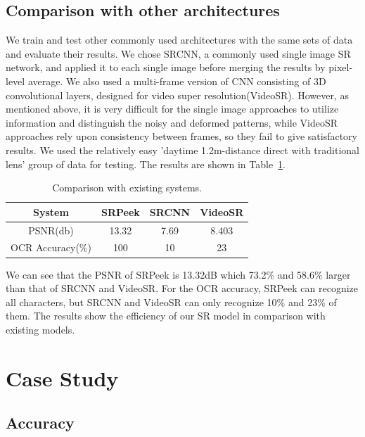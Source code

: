 \subsection{Comparison with other architectures}
We train and test other commonly used architectures with the same sets of data and evaluate their results. We chose SRCNN, a commonly used single image SR network, and applied it to each single image before merging the results by pixel-level average. We also used a multi-frame version of CNN consisting of 3D convolutional layers, designed for video super resolution(VideoSR). However, as mentioned above, it is very difficult for the single image approaches to utilize information and distinguish the noisy and deformed patterns, while VideoSR approaches rely upon consistency between frames, so they fail to give satisfactory results. We used the relatively easy 'daytime 1.2m-distance direct with traditional lens' group of data for testing. The results are shown in Table~\ref{table-comp}.
\begin{table}[!t]
    \centering
    \caption{Comparison with existing systems.}
    \begin{tabular}{@{}cccc@{}}
        \toprule
    System & SRPeek & SRCNN & VideoSR \\ \midrule
    PSNR(db) & 13.32 & 7.69 & 8.403\\ 
    OCR Accuracy(\%) & 100 & 10 & 23\\ \bottomrule
    \end{tabular}
    \label{table-comp}
\end{table}

We can see that the PSNR of SRPeek is 13.32dB which 73.2\% and 58.6\% larger than that of SRCNN and VideoSR. For the OCR accuracy, SRPeek can recognize all characters, but SRCNN and VideoSR can only recognize 10\% and 23\% of them. The results show the efficiency of our SR model in comparison with existing models.

\section{Case Study}
\label{case-study}
\subsection{Accuracy}

